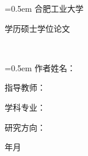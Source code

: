 \begin{titlepage}
\centering

{
\parskip=0.5em
\linespread{1.25}
\LARGE \heiti
合\hspace{1.5em}肥\hspace{1.5em}工\hspace{1.5em}业\hspace{1.5em}大\hspace{1.5em}学\vspace{1.5cm}

{\heiti 学历硕士学位论文}\vspace{1.5cm}

\centering\songti \bfseries{\titleCna} \\
\centering\songti \bfseries{\titleCnb} \vspace{6cm}

}

{
\parskip=0.5em \linespread{1.5}
\songti \sanhao
作者姓名：\underlineFixlen[8.8cm]{\studentNameCn}

指导教师：\underlineFixlen[8.8cm]{\supervisor}

学科专业：\underlineFixlen[8.8cm]{\major}

研究方向：\underlineFixlen[8.8cm]{\object}

\vspace{3.2cm}
\large
\finishedYear 年\finishedMonth 月
}


\end{titlepage}
